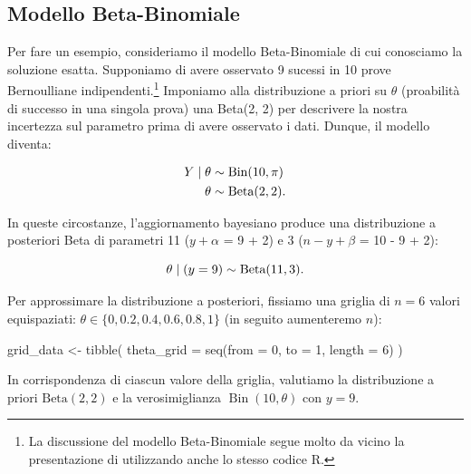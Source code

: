 \documentclass[
  11pt,
]{krantz}
\makeatletter
\newenvironment{Shaded}{\begin{snugshade}}{\end{snugshade}}
\newcommand{\AttributeTok}[1]{\textcolor[rgb]{0.61,0.61,0.61}{#1}}
\newcommand{\DecValTok}[1]{\textcolor[rgb]{0.06,0.06,0.06}{#1}}
\newcommand{\FunctionTok}[1]{\textcolor[rgb]{0,0,0}{#1}}
\newcommand{\NormalTok}[1]{#1}
\newcommand{\OtherTok}[1]{\textcolor[rgb]{0.37,0.37,0.37}{#1}}
\newenvironment{kframe}{%
\medskip{}
\setlength{\fboxsep}{.8em}
 \def\at@end@of@kframe{}%
 \ifinner\ifhmode%
  \def\at@end@of@kframe{\end{minipage}}%
  \begin{minipage}{\columnwidth}%
 \fi\fi%
 \def\FrameCommand##1{\hskip\@totalleftmargin \hskip-\fboxsep
 \colorbox{shadecolor}{##1}\hskip-\fboxsep
     \hskip-\linewidth \hskip-\@totalleftmargin \hskip\columnwidth}%
 \MakeFramed {\advance\hsize-\width
   \@totalleftmargin\z@ \linewidth\hsize
   \@setminipage}}%
 {\par\unskip\endMakeFramed%
 \at@end@of@kframe}
\renewenvironment{Shaded}{\begin{kframe}}{\end{kframe}}
\DeclareMathOperator{\Bin}{Bin} %
\newcommand{\R}{\textsf{R}} %
\theoremstyle{definition}
\theoremstyle{definition}
\theoremstyle{definition}
\theoremstyle{definition}
\theoremstyle{remark}
\makeatother
\begin{document}
\hypertarget{modello-beta-binomiale}{%
\subsection{Modello Beta-Binomiale}\label{modello-beta-binomiale}}

Per fare un esempio, consideriamo il modello Beta-Binomiale di cui conosciamo la soluzione esatta. Supponiamo di avere osservato 9 sucessi in 10 prove Bernoulliane indipendenti.\footnote{La discussione del modello Beta-Binomiale segue molto da vicino la presentazione di \citet{Johnson2022bayesrules} utilizzando anche lo stesso codice \R.} Imponiamo alla distribuzione a priori su \(\theta\) (proabilità di successo in una singola prova) una Beta(2, 2) per descrivere la nostra incertezza sul parametro prima di avere osservato i dati. Dunque, il modello diventa:

\begin{align}
Y \mid \theta & \sim \text{Bin}(10, \pi) \notag\\
\theta & \sim \mbox{Beta}(2, 2).\notag
\end{align}

In queste circostanze, l'aggiornamento bayesiano produce una distribuzione a posteriori Beta di parametri 11 (\(y + \alpha\) = 9 + 2) e 3 (\(n - y + \beta\) = 10 - 9 + 2):

\begin{equation}
\theta \mid (y = 9) \sim \mbox{Beta}(11, 3).\notag
\end{equation}

Per approssimare la distribuzione a posteriori, fissiamo una griglia di \(n = 6\) valori equispaziati: \(\theta \in \{0, 0.2, 0.4, 0.6, 0.8, 1\}\) (in seguito aumenteremo \(n\)):

\begin{Shaded}
\begin{Highlighting}[]
\NormalTok{grid\_data }\OtherTok{\textless{}{-}} \FunctionTok{tibble}\NormalTok{(}
  \AttributeTok{theta\_grid =} \FunctionTok{seq}\NormalTok{(}\AttributeTok{from =} \DecValTok{0}\NormalTok{, }\AttributeTok{to =} \DecValTok{1}\NormalTok{, }\AttributeTok{length =} \DecValTok{6}\NormalTok{)}
\NormalTok{)}
\end{Highlighting}
\end{Shaded}

In corrispondenza di ciascun valore della griglia, valutiamo la distribuzione a priori \(\mbox{Beta}(2, 2)\) e la verosimiglianza \(\Bin(10, \theta)\) con \(y = 9\).
\end{document}
